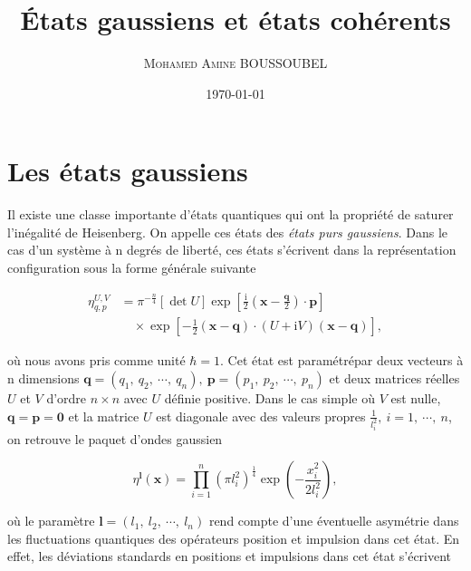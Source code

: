 \documentclass[a4paper, 11pt]{article}
\title{États gaussiens et états cohérents}
\author{\textsc{Mohamed Amine BOUSSOUBEL}}
\date{\today}
\renewcommand{\i}{\mathrm{i}}
\begin{document}
	\maketitle
	
	\tableofcontents
	
	\section{Les états gaussiens}
	
	Il existe une classe importante d’états quantiques qui ont la propriété de saturer l’inégalité de Heisenberg. On appelle ces états des \textit{états purs gaussiens}. Dans le cas d’un système à n degrés de liberté, ces états s’écrivent dans la représentation configuration sous la forme générale suivante \cite{Ali2000}
	
	\begin{equation} \label{eq/1}
	\begin{split}
	    \eta_{q, p}^{U, V} 
	        &= \pi^{-\frac{n}{4}} \left[\det U\right] \exp \left[\frac{\i}{2} \left(\mathbf{x} - \frac{\mathbf{q}}{2}\right) \cdot \mathbf{p}\right] \\
	        &\quad \times \exp \left[-\frac{1}{2} \left(\mathbf{x} - \mathbf{q}\right) \cdot \left(U + \i V\right) \left(\mathbf{x} - \mathbf{q}\right)\right],
	 \end{split}
	\end{equation}
	
	\noindent
	où nous avons pris comme unité $\hbar = 1$. Cet état est paramétrépar deux vecteurs à n dimensions $\mathbf{q} = \left(q_1, \ q_2, \ \cdots\!, \ q_n\right), \ \mathbf{p} = \left(p_1, \ p_2, \ \cdots\!, \ p_n\right)$ et deux matrices réelles $U$ et $V$ d’ordre $n \times n$ avec $U$ définie positive. Dans le cas simple où $V$ est nulle, $\mathbf{q} = \mathbf{p} = \mathbf{0}$ et la matrice $U$ est diagonale avec des valeurs propres $\frac{1}{l_i^2}, \ i = 1, \ \cdots\!, \ n$, on retrouve le paquet d’ondes gaussien
	
	\begin{equation} \label{eq/2}
	    \eta^{\mathbf{l}}\left(\mathbf{x}\right) = \prod_{i = 1}^{n} \left(\pi l_i^2\right)^{\frac{1}{4}} \exp \left(- \frac{x_i^2}{2 l_i^2}\right),
	\end{equation}
	
	\noindent
	où le paramètre $\mathbf{l} = (l_1, \ l_2, \ \cdots\!, \ l_n)$ rend compte d’une éventuelle asymétrie dans les fluctuations quantiques des opérateurs position et impulsion dans cet état. En effet, les déviations standards en positions et impulsions dans cet état s’écrivent
	
\end{document}
